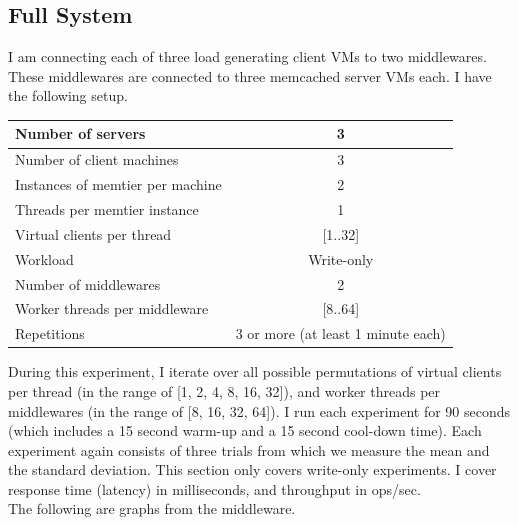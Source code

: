 \documentclass[11pt,a4paper]{article}
\begin{document}
\subsection{Full System}
I am connecting each of three load generating client VMs to two middlewares.
These middlewares are connected to three memcached server VMs each.
I have the following setup.

\begin{center}
	\scriptsize{
		\begin{tabular}{|l|c|}
			\hline Number of servers                & 3          \\ 
			\hline Number of client machines        & 3          \\ 
			\hline Instances of memtier per machine & 2          \\ 
			\hline Threads per memtier instance     & 1          \\
			\hline Virtual clients per thread       & [1..32]    \\ 
			\hline Workload                         & Write-only \\
			\hline Number of middlewares            & 2          \\
			\hline Worker threads per middleware    & [8..64]    \\
			\hline Repetitions                      & 3 or more (at least 1 minute each)  \\ 
			\hline 
		\end{tabular}
	} 
\end{center}

During this experiment, I iterate over all possible permutations of virtual clients per thread (in the range of [1, 2, 4, 8, 16, 32]), and worker threads per middlewares (in the range of [8, 16, 32, 64]).
I run each experiment for 90 seconds (which includes a 15 second warm-up and a 15 second cool-down time). 
Each experiment again consists of three trials from which we measure the mean and the standard deviation.
This section only covers write-only experiments.
I cover response time (latency) in milliseconds, and throughput in ops/sec. \\

The following are graphs from the middleware.
\end{document}

